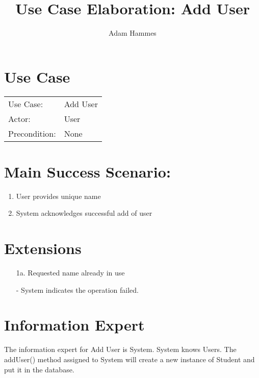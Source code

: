 \documentclass{article}
\title{Use Case Elaboration: Add User}
\author{Adam Hammes}
\begin{document}
\maketitle

\section*{Use Case}

\begin{tabular}{l l}
Use Case:     & Add User \\
Actor:        & User \\
Precondition: & None \\
\end{tabular}

\section*{Main Success Scenario:}

\begin{enumerate}
    \item User provides unique name
    \item System acknowledges successful add of user
\end{enumerate}

\section*{Extensions}

\begin{itemize}
    \item [1a.] Requested name already in use
     
    - System indicates the operation failed.
\end{itemize}

\section*{Information Expert}

The information expert for Add User is System.
System knows Users.
The addUser() method assigned to System will create a new instance of Student and put it in the database.

\pagebreak
\end{document}

